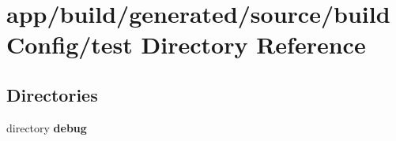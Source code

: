 \section{app/build/generated/source/build\+Config/test Directory Reference}
\label{dir_6c7783b6d0f8342f0b668e84e11d1940}
\subsection*{Directories}
\begin{DoxyCompactItemize}
\item 
directory {\bf debug}
\end{DoxyCompactItemize}
